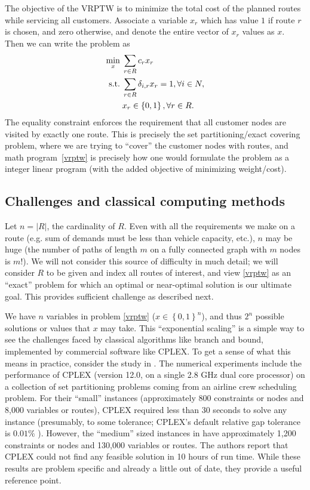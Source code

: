 \documentclass[11pt]{article}
\theoremstyle{definition}
\newcommand{\st}{\mathrm{s.t.}\;}
\newcommand{\set}[1]{\left\{ #1 \right\}}
\newcommand{\card}[1]{\left| #1 \right|}
\newcommand{\0}{\mathbf{0}}
\begin{document}
The objective of the VRPTW is to minimize the total cost of the planned routes while servicing all customers.
Associate a variable $x_r$ which has value $1$ if route $r$ is chosen, and zero otherwise, and denote the entire vector of $x_r$ values as $x$.
Then we can write the problem as
\begin{align}
\label{vrptw}
\min_x\; & \sum_{r \in R} c_r x_r \\
\st
\notag & \sum_{r \in R} \delta_{i,r} x_r = 1, \forall i \in N, \\
\notag & x_r \in \set{0,1}, \forall r \in R.
\end{align}
%
The equality constraint enforces the requirement that all customer nodes are visited by exactly one route.
This is precisely the set partitioning/exact covering problem, where we are trying to ``cover'' the customer nodes with routes, and math program~\eqref{vrptw} is precisely how one would formulate the problem as a integer linear program (with the added objective of minimizing weight/cost).

\subsection*{Challenges and classical computing methods}

Let $n = \card{R}$, the cardinality of $R$.
Even with all the requirements we make on a route (e.g. sum of demands must be less than vehicle capacity, etc.), $n$ may be huge (the number of paths of length $m$ on a fully connected graph with $m$ nodes is $m!$).
We will not consider this source of difficulty in much detail;
we will consider $R$ to be given and index all routes of interest, and view \eqref{vrptw} as an ``exact'' problem for which an optimal or near-optimal solution is our ultimate goal.
This provides sufficient challenge as described next.

We have $n$ variables in problem \eqref{vrptw} ($x \in \set{0,1}^n$), and thus $2^n$ possible solutions or values that $x$ may take.
This ``exponential scaling'' is a simple way to see the challenges faced by classical algorithms like branch and bound, implemented by commercial software like CPLEX.
To get a sense of what this means in practice, consider the study in \cite{zaghroutiEA14}.
The numerical experiments include the performance of CPLEX (version 12.0, on a single 2.8 GHz dual core processor) on a collection of set partitioning problems coming from an airline crew scheduling problem.
For their ``small'' instances (approximately 800 constraints or nodes and 8,000 variables or routes), CPLEX required less than 30 seconds to solve any instance 
(presumably, to some tolerance;
CPLEX's default relative gap tolerance is $0.01\%$ \cite{cplex}).
However, the ``medium'' sized instances in \cite{zaghroutiEA14} have approximately 1,200 constraints or nodes and 130,000 variables or routes.
The authors report that CPLEX could not find any feasible solution in 10 hours of run time.
While these results are problem specific and already a little out of date, they provide a useful reference point.
\end{document}
